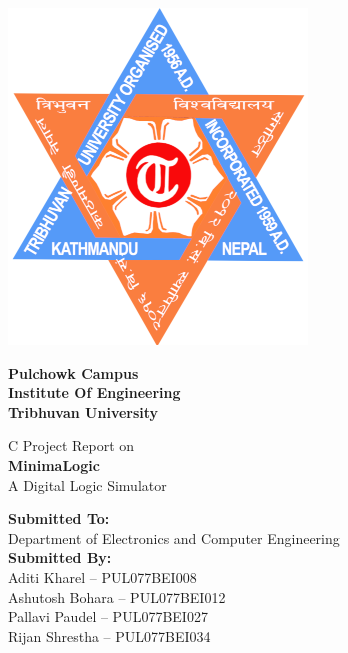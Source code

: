\documentclass[main.tex]{subfiles}
\begin{document}
    \begin{titlepage}
        \begin{center}
            \includegraphics[width=0.22\linewidth]{../graphics/TU-logo.png}\\[0.5cm]
            \begin{large}
                \textbf{Pulchowk Campus\\
                Institute Of Engineering\\
                Tribhuvan University\\[3cm]}
            \end{large}
            \large{C Project Report on\\}
            \Huge{\textbf{MinimaLogic}\\}
            \large{A Digital Logic Simulator\\[2cm]}
            \begin{large}
                \textbf{Submitted To:}\\
                {\Large Department of Electronics and Computer Engineering\\[1cm]}
                \textbf{Submitted By:}\\
                Aditi Kharel – PUL077BEI008\\
                Ashutosh Bohara – PUL077BEI012\\
                Pallavi Paudel – PUL077BEI027\\
                Rijan Shrestha – PUL077BEI034\\
            \end{large}
        \end{center}
    \end{titlepage}
\end{document}
